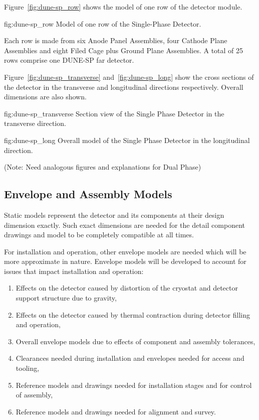 Figure~\ref{fig:dune-sp_row} shows the model of one row of the
detector module.
\begin{dunefigure}{fig:dune-sp_row}
  {Model of one row of the Single-Phase Detector.}
\end{dunefigure}
Each row is made from six Anode Panel Assemblies,
four Cathode Plane Assemblies and eight Filed Cage plus Ground Plane
Assemblies. A total of 25 rows comprise one DUNE-SP far detector.

Figure~\ref{fig:dune-sp_transverse} and~\ref{fig:dune-sp_long} show
the cross sections of the detector in the transverse and longitudinal
directions respectively. Overall dimensions are also shown.
\begin{dunefigure}{fig:dune-sp_transverse}
  {Section view of the Single Phase Detector in the transverse direction.}
\end{dunefigure}
\begin{dunefigure}{fig:dune-sp_long}
  {Overall model of the Single Phase Detector in the longitudinal direction.}
\end{dunefigure}

(Note: Need analogous figures and explanations for Dual Phase)

\subsection{Envelope and Assembly Models}
\label{sec:fdsp-coord-integ-envelope}
Static models represent the detector and its components at their
design dimension exactly. Such exact dimensions are needed for the
detail component drawings and model to be completely compatible at all
times.

For installation and operation, other envelope models are needed which
will be more approximate in nature. Envelope models will be developed
to account for issues that impact installation and operation:
\begin{enumerate}
 \item Effects on the detector caused by distortion of the cryostat
   and detector support structure due to gravity,
 \item Effects on the detector caused by thermal contraction during
   detector filling and operation,
 \item Overall envelope models due to effects of component and
   assembly tolerances,
 \item Clearances needed during installation and envelopes needed for
   access and tooling,
 \item Reference models and drawings needed for installation stages
   and for control of assembly,
 \item Reference models and drawings needed for alignment and survey.
\end{enumerate}


